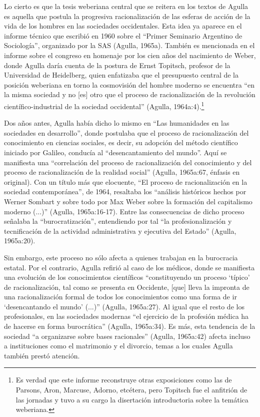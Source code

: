 Lo cierto es que la tesis weberiana central que se reitera en los textos de Agulla es aquella que postula la progresiva racionalización de las esferas de acción de la vida de los hombres en las sociedades occidentales. Esta idea ya aparece en el informe técnico que escribió en 1960 sobre el ``Primer Seminario Argentino de Sociología'', organizado por la SAS (Agulla, 1965a). También es mencionada en el informe sobre el congreso en homenaje por los cien años del nacimiento de Weber, donde Agulla daría cuenta de la postura de Ernst Topitsch, profesor de la Universidad de Heidelberg, quien enfatizaba que el presupuesto central de la posición weberiana en torno la cosmovisión del hombre moderno se encuentra ``en la misma sociedad y no {[}es{]} otro que el proceso de racionalización de la revolución científico-industrial de la sociedad occidental'' (Agulla, 1964a:4).\footnote{Es verdad que este informe reconstruye otras exposiciones como las de Parsons, Aron, Marcuse, Adorno, etcétera, pero Topitsch fue el anfitrión de las jornadas y tuvo a su cargo la disertación introductoria sobre la temática weberiana.}

Dos años antes, Agulla había dicho lo mismo en ``Las humanidades en las sociedades en desarrollo'', donde postulaba que el proceso de racionalización del conocimiento en ciencias sociales, es decir, su adopción del método científico iniciado por Galileo, conducía al ``desencantamiento del mundo''. Aquí se manifiesta una ``correlación del proceso de racionalización del conocimiento y del proceso de racionalización de la realidad social'' (Agulla, 1965a:67, énfasis en original). Con un título más que elocuente, ``El proceso de racionalización en la sociedad contemporánea'', de 1964, resaltaba los ``análisis históricos hechos por Werner Sombart y sobre todo por Max Weber sobre la formación del capitalismo moderno (...)'' (Agulla, 1965a:16-17). Entre las consecuencias de dicho proceso señalaba la ``burocratización'', entendiendo por tal ``la profesionalización y tecnificación de la actividad administrativa y ejecutiva del Estado'' (Agulla, 1965a:20).

Sin embargo, este proceso no sólo afecta a quienes trabajan en la burocracia estatal. Por el contrario, Agulla refirió al caso de los médicos, donde se manifiesta una evolución de los conocimientos científicos ``constituyendo un proceso `típico' de racionalización, tal como se presenta en Occidente, {[}que{]} lleva la impronta de una racionalización formal de todos los conocimientos como una forma de ir `desencantando el mundo' (...)'' (Agulla, 1965a:27). Al igual que el resto de los profesionales, en las sociedades modernas ``el ejercicio de la profesión médica ha de hacerse en forma burocrática'' (Agulla, 1965a:34). Es más, esta tendencia de la sociedad ``a organizarse sobre bases racionales'' (Agulla, 1965a:42) afecta incluso a instituciones como el matrimonio y el divorcio, temas a los cuales Agulla también prestó atención.

